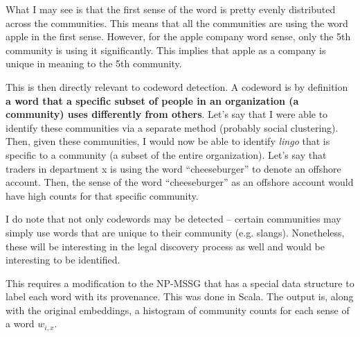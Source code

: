 What I may see is that the first sense of the word is pretty evenly distributed across the communities. This means that all the communities are using the word apple in the first sense. However, for the apple company word sense, only the 5th community is using it significantly. This implies that apple as a company is unique in meaning to the 5th community.

This is then directly relevant to codeword detection. A codeword is by definition \textbf{a word that a specific subset of people in an organization (a community) uses differently from others}. Let's say that I were able to identify these communities via a separate method (probably social clustering). Then, given these communities, I would now be able to identify \emph{lingo} that is specific to a community (a subset of the entire organization). Let's say that traders in department x is using the word ``cheeseburger'' to denote an offshore account. Then, the sense of the word ``cheeseburger'' as an offshore account would have high counts for that specific community.

I do note that not only codewords may be detected -- certain communities may simply use words that are unique to their community (e.g. slangs). Nonetheless, these will be interesting in the legal discovery process as well and would be interesting to be identified.

This requires a modification to the NP-MSSG that has a special data structure to label each word with its provenance. This was done in Scala. The output is, along with the original embeddings, a histogram of community counts for each sense of a word $w_{i,x}$.


